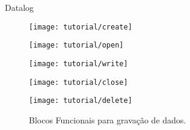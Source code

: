 \begin{frame}{Datalog}
   \begin{figure}[ht]
       \begin{minipage}[b]{0.3\linewidth}
         \centering
 \texttt{[image: tutorial/create]}
       \end{minipage}
       \begin{minipage}[b]{0.3\linewidth}
         \centering
 \texttt{[image: tutorial/open]}
\end{minipage}
       \begin{minipage}[b]{0.3\linewidth}
         \centering
	\texttt{[image: tutorial/write]}
       \end{minipage}
       \hspace{0.5cm}
       \begin{minipage}[b]{0.3\linewidth}
           \centering
	\texttt{[image: tutorial/close]}
       \end{minipage}
       \begin{minipage}[b]{0.3\linewidth}
           \centering
           \texttt{[image: tutorial/delete]}
       \end{minipage}
  \caption{Blocos Funcionais para gravação de dados.}
   \end{figure}
\end{frame}



